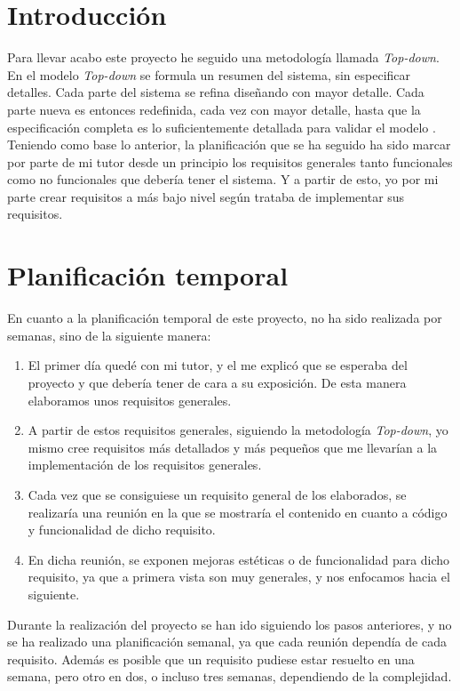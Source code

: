 
\section{Introducción}

Para llevar acabo este proyecto he seguido una metodología llamada \textit{Top-down}. 
En el modelo \textit{Top-down} se formula un resumen del sistema, sin especificar detalles. Cada parte del sistema se refina diseñando con mayor detalle. Cada parte nueva es entonces redefinida, cada vez con mayor detalle, hasta que la especificación completa es lo suficientemente detallada para validar el modelo \cite{wiki:topdown}. Teniendo como base lo anterior, la planificación que se ha seguido ha sido marcar por parte de mi tutor desde un principio los requisitos generales tanto funcionales como no funcionales que debería tener el sistema. Y a partir de esto, yo por mi parte crear requisitos a más bajo nivel según trataba de implementar sus requisitos.

\section{Planificación temporal}

En cuanto a la planificación temporal de este proyecto, no ha sido realizada por semanas, sino de la siguiente manera:

\begin{enumerate}
	\item El primer día quedé con mi tutor, y el me explicó que se esperaba del proyecto y que debería tener de cara a su exposición. De esta manera elaboramos unos requisitos generales.
	\item A partir de estos requisitos generales, siguiendo la metodología \textit{Top-down}, yo mismo cree requisitos más detallados y más pequeños que me llevarían a la implementación de los requisitos generales.
	\item Cada vez que se consiguiese un requisito general de los elaborados, se realizaría  una reunión en la que se mostraría el contenido en cuanto a código y funcionalidad de dicho requisito.
	\item En dicha reunión, se exponen mejoras estéticas o de funcionalidad para dicho requisito, ya que a primera vista son muy generales, y nos enfocamos hacia el siguiente.
\end{enumerate}

Durante la realización del proyecto se han ido siguiendo los pasos anteriores, y no se ha realizado una planificación semanal, ya que cada reunión dependía de cada requisito. Además es posible que un requisito pudiese estar resuelto en una semana, pero otro en dos, o incluso tres semanas, dependiendo de la complejidad.

